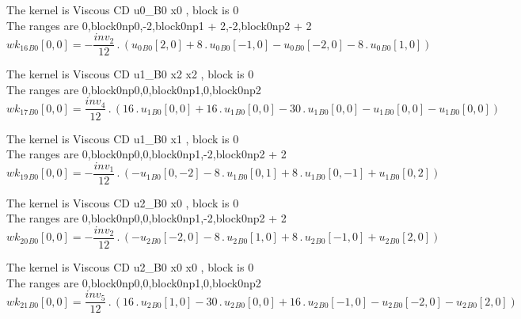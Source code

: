 \documentclass{article}
\begin{document}
\noindent The kernel is Viscous CD u0_B0 x0 , block is 0\\\noindent The ranges are 0,block0np0,-2,block0np1 + 2,-2,block0np2 + 2\\\begin{dmath}{wk_{16}{_{B0}}}[{0,0}] = - \frac{inv_2}{12} \,.\, \left({u_{0}{_{B0}}}[{2,0}] + 8 \,.\, {u_{0}{_{B0}}}[{-1,0}] - {u_{0}{_{B0}}}[{-2,0}] - 8 \,.\, {u_{0}{_{B0}}}[{1,0}]\right)\end{dmath}

\noindent The kernel is Viscous CD u1_B0 x2 x2 , block is 0\\\noindent The ranges are 0,block0np0,0,block0np1,0,block0np2\\\begin{dmath}{wk_{17}{_{B0}}}[{0,0}] = \frac{inv_4}{12} \,.\, \left(16 \,.\, {u_{1}{_{B0}}}[{0,0}] + 16 \,.\, {u_{1}{_{B0}}}[{0,0}] - 30 \,.\, {u_{1}{_{B0}}}[{0,0}] - {u_{1}{_{B0}}}[{0,0}] - {u_{1}{_{B0}}}[{0,0}]\right)\end{dmath}

\noindent The kernel is Viscous CD u1_B0 x1 , block is 0\\\noindent The ranges are 0,block0np0,0,block0np1,-2,block0np2 + 2\\\begin{dmath}{wk_{19}{_{B0}}}[{0,0}] = - \frac{inv_1}{12} \,.\, \left(- {u_{1}{_{B0}}}[{0,-2}] - 8 \,.\, {u_{1}{_{B0}}}[{0,1}] + 8 \,.\, {u_{1}{_{B0}}}[{0,-1}] + {u_{1}{_{B0}}}[{0,2}]\right)\end{dmath}

\noindent The kernel is Viscous CD u2_B0 x0 , block is 0\\\noindent The ranges are 0,block0np0,0,block0np1,-2,block0np2 + 2\\\begin{dmath}{wk_{20}{_{B0}}}[{0,0}] = - \frac{inv_2}{12} \,.\, \left(- {u_{2}{_{B0}}}[{-2,0}] - 8 \,.\, {u_{2}{_{B0}}}[{1,0}] + 8 \,.\, {u_{2}{_{B0}}}[{-1,0}] + {u_{2}{_{B0}}}[{2,0}]\right)\end{dmath}

\noindent The kernel is Viscous CD u2_B0 x0 x0 , block is 0\\\noindent The ranges are 0,block0np0,0,block0np1,0,block0np2\\\begin{dmath}{wk_{21}{_{B0}}}[{0,0}] = \frac{inv_5}{12} \,.\, \left(16 \,.\, {u_{2}{_{B0}}}[{1,0}] - 30 \,.\, {u_{2}{_{B0}}}[{0,0}] + 16 \,.\, {u_{2}{_{B0}}}[{-1,0}] - {u_{2}{_{B0}}}[{-2,0}] - {u_{2}{_{B0}}}[{2,0}]\right)\end{dmath}
\end{document}
